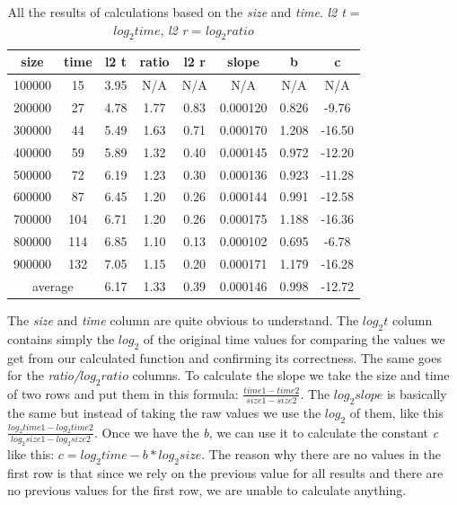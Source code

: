 \documentclass[12pt]{article}
\begin{document}
\begin{table}[h]
    \centering
    \begin{tabular}{|c|c|c|c|c|c|c|c|}
        \hline size &	time &	l2 t &	ratio &	l2 r &	slope &	b &	c \\
        \hline 100000 &	15 &	3.95 &	N/A &	N/A &	N/A &	    N/A&	N/A \\
        \hline 200000 &	27 &	4.78 &	1.77 &	0.83 &	0.000120 &	0.826 &	-9.76 \\
        \hline 300000 &	44 &	5.49 &	1.63 &	0.71 &	0.000170 &	1.208 &	-16.50 \\
        \hline 400000 &	59 &	5.89 &	1.32 &	0.40 &	0.000145 &	0.972 &	-12.20 \\
        \hline 500000 &	72 &	6.19 &	1.23 &	0.30 &	0.000136 &	0.923 &	-11.28 \\
        \hline 600000 &	87 &	6.45 &	1.20 &	0.26 &	0.000144 &	0.991 &	-12.58 \\
        \hline 700000 &	104 &	6.71 &	1.20 &	0.26 &	0.000175 &	1.188 &	-16.36 \\
        \hline 800000 &	114 &	6.85 &	1.10 &	0.13 &	0.000102 &	0.695 &	-6.78 \\
        \hline 900000 &	132 &	7.05 &	1.15 &	0.20 &	0.000171 &	1.179 &	-16.28 \\
        \hline \multicolumn{2}{|c|}{average} & 6.17  &	1.33 &	0.39 &	0.000146 &	0.998 &	-12.72 \\
        \hline
    \end{tabular}
    \caption{\small{All the results of calculations based on the \emph{size} and \emph{time}. \emph{l2 t} = \emph{$log_2 time$}, \emph{l2 r} = \emph{$log_2 ratio$}}}
\end{table}

The \emph{size} and \emph{time} column are quite obvious to understand. The \emph{$log_2 t$} column contains
simply the $log_2$ of the original time values for comparing the values we get from our calculated
function and confirming its correctness. The same goes for the \emph{ratio/$log_2 ratio$} columns.
To calculate the slope we take the size and time of two rows and put them in this formula:
$\frac{time1 - time2}{size1 - size2}$. The \emph{$log_2 slope$} is basically the same but instead
of taking the raw values we use the $log_2$ of them, like this $\frac{log_2 time1 - log_2 time2}{log_2 size1 - log_2 size2}$.
Once we have the \emph{b}, we can use it to calculate the constant \emph{c} like this:
\emph{$c = log_2 time - b * log_2 size$}.
The reason why there are no values in the first row is that since we rely on the previous value for 
all results and there are no previous values for the first row, we are unable to calculate anything.
\end{document}
